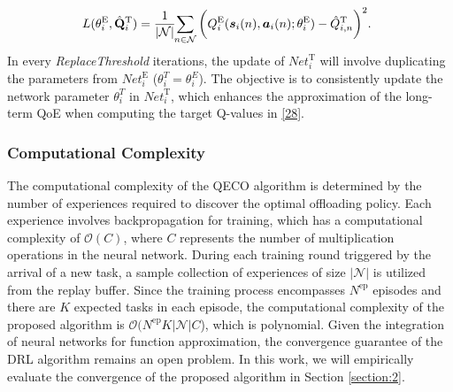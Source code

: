 \documentclass[12pt,draftclsnofoot,onecolumn]{IEEEtran}
\begin{document}
\begin{alignat}{1}
	\hspace{-2mm}L(\theta_i^{\text{E}},\hat{\mathbf{Q}}_i^{\text{T}}) = {1 \over |\mathcal{N}| }\hspace{-1mm} \sum\limits_{n \in \mathcal{N}} \bigg(Q_i^{\text{E}}(\boldsymbol{s}_i(n) , \boldsymbol{a}_i(n); \theta_i^{\text{E}} ) -   \hat{Q}^{\text{T}}_{i,n}  \bigg)^2.
	\label{30}  
\end{alignat}  
In every \textit{ReplaceThreshold} iterations, the update of $\textit{Net}_i^{\text{T}}$ will involve duplicating the parameters from $\textit{Net}_i^{\text{E}}$ ($\theta_i^{T} = \theta_i^{E}$). The objective is to consistently update the network parameter $\theta_i^{T}$ in $\textit{Net}_i^{\text{T}}$, which enhances the approximation of the long-term QoE when computing the target Q-values in \eqref{28}.\\

\subsubsection{Computational Complexity}


The computational complexity of the QECO algorithm is determined by the number of experiences required to discover the optimal offloading policy. Each experience involves backpropagation for training, which has a computational complexity of $\mathcal{O}(C)$, where $C$ represents the number of multiplication operations in the neural network. During each training round triggered by the arrival of a new task, a sample collection of experiences of size $|\mathcal{N}|$ is utilized from the replay buffer. Since the training process encompasses $N^{\text{ep}}$ episodes and there are $K$ expected tasks in each episode, the computational complexity of the proposed algorithm is $\mathcal{O}(N^{\text{ep}}K|\mathcal{N}|C$), which is polynomial. Given the integration of neural networks for function approximation, the convergence guarantee of the DRL algorithm remains an open problem. In this work, we will empirically evaluate the convergence of the proposed algorithm in Section \ref{section:2}.

\end{document}
